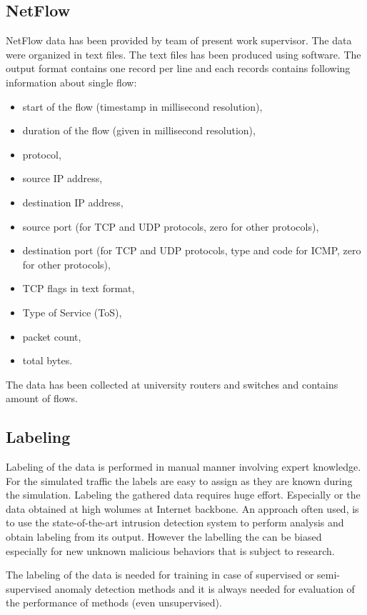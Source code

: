 \subsection{NetFlow}

NetFlow data has been provided by team of present work supervisor. The data were organized
in text files. The text files has been produced using  \cite{haag2006netflow}
software. The output format contains one record per line and each records contains following
information about single flow:
\begin{itemize}
\item start of the flow (timestamp in millisecond resolution),
\item duration of the flow (given in millisecond resolution),
\item protocol,
\item source IP address,
\item destination IP address,
\item source port (for TCP and UDP protocols, zero for other protocols),
\item destination port (for TCP and UDP protocols, type and code for ICMP, 
	zero for other protocols),
\item TCP flags in text format,
\item Type of Service (ToS),
\item packet count,
\item total bytes.
\end{itemize}

The data has been collected at university routers and switches and contains %
amount of flows.

\subsection{Labeling}

Labeling of the data is performed in manual manner involving expert knowledge.
For the simulated traffic the labels are easy to assign as they are known during the simulation.
Labeling the gathered data requires huge effort. Especially or the data obtained at high 
wolumes at Internet backbone. An approach often used, is to use the state-of-the-art
intrusion detection system to perform analysis and obtain labeling from its output. 
However the labelling the can be biased especially for new unknown malicious behaviors
that is subject to research.

The labeling of the data is needed for training in case of supervised or semi-supervised
anomaly detection methods and it is always needed for evaluation of the performance of methods
(even unsupervised).



